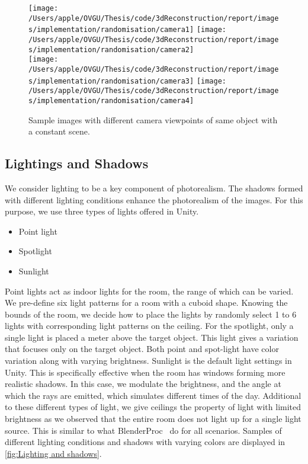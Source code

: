 \begin{figure}
    \centering
    \texttt{[image: /Users/apple/OVGU/Thesis/code/3dReconstruction/report/images/implementation/randomisation/camera1]}
    \texttt{[image: /Users/apple/OVGU/Thesis/code/3dReconstruction/report/images/implementation/randomisation/camera2]}\\
    \vspace{0.1cm}
    \texttt{[image: /Users/apple/OVGU/Thesis/code/3dReconstruction/report/images/implementation/randomisation/camera3]}
    \texttt{[image: /Users/apple/OVGU/Thesis/code/3dReconstruction/report/images/implementation/randomisation/camera4]}\\
    \caption{Sample images with different camera viewpoints of same object with a constant scene.}
    \label{fig:Camera viewpoints}
\end{figure}

\subsection{Lightings and Shadows}\label{subsec:lightings-and-shadows}

We consider lighting to be a key component of photorealism.
The shadows formed with different lighting conditions enhance the photorealism of the images.
For this purpose, we use three types of lights offered in Unity.

\begin{itemize}
    \item Point light
    \item Spotlight
    \item Sunlight
\end{itemize}

Point lights act as indoor lights for the room, the range of which can be varied.
We pre-define six light patterns for a room with a cuboid shape.
Knowing the bounds of the room, we decide how to place the lights by randomly select 1 to 6 lights with corresponding light patterns on the ceiling.
For the spotlight, only a single light is placed a meter above the target object.
This light gives a variation that focuses only on the target object.
Both point and spot-light have color variation along with varying brightness.
Sunlight is the default light settings in Unity.
This is specifically effective when the room has windows forming more realistic shadows.
In this case, we modulate the brightness, and the angle at which the rays are emitted, which simulates different times of the day.
Additional to these different types of light, we give ceilings the property of light with limited brightness as we observed that the entire room does not light up for a single light source.
This is similar to what BlenderProc~\cite{denninger2019blenderproc} do for all scenarios.
Samples of different lighting conditions and shadows with varying colors are displayed in \autoref{fig:Lighting and shadows}.

